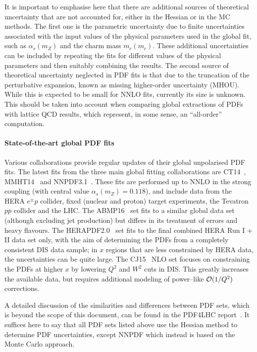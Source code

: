 It is important to emphasise here that there are additional sources of theoretical
uncertainty that are not accounted for, either in the Hessian or
in the MC methods.
%
The first one is the parametric uncertainty due to finite uncertainties associated
with the input values of the physical parameters used in the global fit, such
as $\alpha_s(m_Z)$ and the charm mass $m_c(m_c)$.
%
These additional uncertainties can be included by repeating the fits for different values of the
physical parameters and then suitably combining the results.
%
The second source of theoretical uncertainty neglected in PDF fits
is that due to the truncation of the perturbative expansion, known
as missing higher-order uncertainty (MHOU).
%
While this is expected to be small for NNLO fits, currently its size is unknown.
This should be taken into account when comparing global extractions of PDFs with lattice
QCD results, which represent, in some sense, an ``all-order'' computation.

\paragraph{State-of-the-art global PDF fits}
%
Various collaborations provide regular updates of their global unpolarised
PDF fits.
%
The latest fits from the three main global fitting collaborations
are CT14~\cite{Dulat:2015mca}, MMHT14~\cite{Harland-Lang:2014zoa} and
NNPDF3.1~\cite{Ball:2017nwa}.
%
These fits are performed up to NNLO in the strong coupling (with central value
$\alpha_s(m_Z)=0.118$),
and include data from the HERA $e^{\pm} p$ collider, fixed (nuclear and proton) target experiments, the Tevatron $p\overline{p}$ collider and the LHC. 
%
The ABMP16~\cite{Alekhin:2017kpj} set fits to a similar global data set
(although excluding jet production)
but differs in its treatment of errors and heavy flavours.
%
The HERAPDF2.0~\cite{Abramowicz:2015mha} set fits to the final combined HERA Run I + II data set only, with the aim of determining the PDFs from a completely consistent DIS data sample; in $x$ regions that are less constrained by HERA data, the uncertainties can be quite large.
%
The CJ15~\cite{Accardi:2016qay} NLO set focuses on constraining the PDFs at higher $x$ by lowering $Q^2$ and $W^2$ cuts in DIS.
%
This greatly increases the available data, but requires additional modeling of power--like ${\cal O}(1/Q^2)$ corrections.

A detailed discussion of the similarities and differences between
PDF sets, which is beyond the scope of this document,
can be found in the PDF4LHC report~\cite{Butterworth:2015oua}.
%
It suffices here to say that all PDF sets listed above use the Hessian
method to determine PDF uncertainties,
except NNPDF which instead
is based on the Monte Carlo approach.

